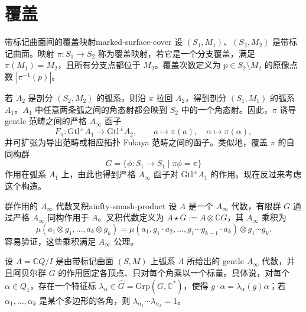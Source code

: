 \section{覆盖}\label{sec:covers}
\begin{definition}{带标记曲面间的覆盖映射}{marked-surface-cover}
设 $(S_1,M_1)$、$(S_2,M_2)$ 是带标记曲面。映射 $\pi\colon S_1\to S_2$ 称为覆盖映射，若它是一个分支覆盖，满足 $\pi(M_1)=M_2$，且所有分支点都位于 $M_2$。覆盖次数定义为 $p\in S_2\setminus M_2$ 的原像点数 $|\pi^{-1}(p)|$。
\end{definition}

若 $A_2$ 是剖分 $(S_2,M_2)$ 的弧系，则沿 $\pi$ 拉回 $A_2$，得到剖分 $(S_1,M_1)$ 的弧系 $A_1$。$A_1$ 中任意两条弧之间的角态射都会映到 $S_2$ 中的一个角态射。因此，$\pi$ 诱导 gentle 范畴之间的严格 $A_\infty$ 函子
\[
  F_\pi\colon\mathrm{Gtl}^{\pm}A_1\longrightarrow\mathrm{Gtl}^{\pm}A_2,
  \qquad a\longmapsto\pi(a),\quad\alpha\longmapsto\pi(\alpha),
\]
并可扩张为导出范畴或相应拓扑 Fukaya 范畴之间的函子。类似地，覆盖 $\pi$ 的自同构群
\[
  G=\{\phi\colon S_1\to S_1\mid \pi\phi=\pi\}
\]
作用在弧系 $A_1$ 上，由此也得到严格 $A_\infty$ 函子对 $\mathrm{Gtl}^{\pm}A_1$ 的作用。现在反过来考虑这个构造。

\begin{definition}{群作用的 $A_\infty$ 代数叉积}{ainfty-smash-product}
设 $A$ 是一个 $A_\infty$ 代数，有限群 $G$ 通过严格 $A_\infty$ 同构作用于 $A$。叉积代数定义为 $A\star G:=A\otimes\mathbb CG$，其 $A_\infty$ 乘积为
\[
  \mu(a_1\otimes g_1,\ldots,a_k\otimes g_k)
  =\mu(a_1,g_1\cdot a_2,\ldots,g_1\cdots g_{k-1}\cdot a_k)
  \otimes g_1\cdots g_k.
\]
容易验证，这些乘积满足 $A_\infty$ 公理。
\end{definition}

设 $A=\mathbb C Q/I$ 是由带标记曲面 $(S,M)$ 上弧系 $A$ 所给出的 gentle $A_\infty$ 代数，并且阿贝尔群 $G$ 的作用固定各顶点、只对每个角乘以一个标量。具体说，对每个 $\alpha\in Q_1$，存在一个特征标 $\lambda_\alpha\in\widehat G=\mathrm{Grp}(G,\mathbb C^*)$，使得 $g\cdot\alpha=\lambda_\alpha(g)\alpha$；若 $\alpha_1,\ldots,\alpha_k$ 是某个多边形的各角，则 $\lambda_{\alpha_1}\cdots\lambda_{\alpha_k}=1$。

